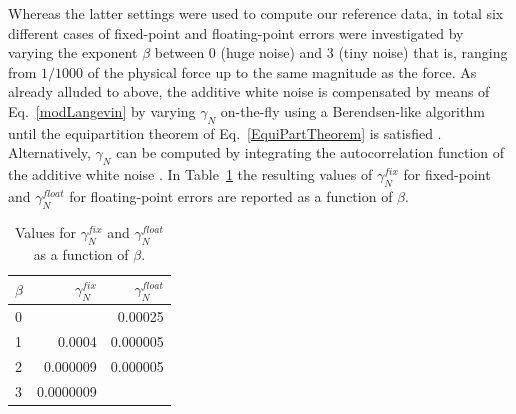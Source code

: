 \documentclass[format=acmsmall,review,timestamp,urlbreakonhyphens]{acmart}
\begin{document}
Whereas the latter settings were used to compute our reference data, in total six different cases of fixed-point and floating-point errors were investigated by varying the exponent $\beta$ between 0 (huge noise) and 3 (tiny noise) that is, ranging from $1/1000$ of the physical force up to the same magnitude as the force. %
As already alluded to above, the additive white noise is compensated by means of Eq.~\ref{modLangevin} by varying $\gamma_N$ on-the-fly using a Berendsen-like algorithm until the equipartition theorem of Eq.~\ref{EquiPartTheorem} is satisfied \cite{Berendsen,TDKwater,TDKrev}. Alternatively, $\gamma_N$ can be computed by integrating the autocorrelation function of the additive white noise \cite{RZK}.
In Table~\ref{tab:gamma} the resulting values of \textit{\(\gamma_N^{fix}\)} for fixed-point and \textit{\(\gamma_N^{float}\)} for floating-point errors are reported as a function of \textit{\(\beta\)}. %
\begin{table}
  \caption{Values for \textit{\(\gamma_N^{fix}\)} and \textit{\(\gamma_N^{float}\)} as a function of \textit{\(\beta\)}.}
  \label{tab:gamma}
  \begin{tabular}{lrr}
    \textit{\(\beta\)} & \textit{\(\gamma_N^{fix}\)} & \textit{\(\gamma_N^{float}\)} \\
    \hline
    0 &           & 0.00025  \\
    1 & 0.0004    & 0.000005 \\
    2 & 0.000009  & 0.000005 \\
    3 & 0.0000009 &
  \end{tabular}
\end{table}
\end{document}
